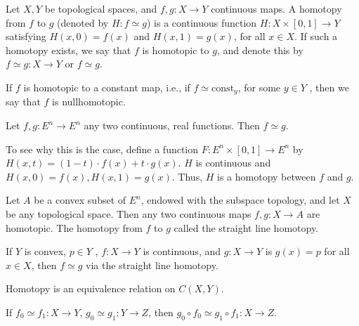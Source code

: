 \begin{definition}{}{}
    Let $X, Y$ be topological spaces, and $f, g : X \rightarrow Y$ continuous maps.
A homotopy from $f$ to $g$ (denoted by $H: f\simeq g$) is a continuous function $H : X \times [0, 1] \rightarrow Y$ satisfying
$H(x, 0) = f(x)$ and $H(x, 1) = g(x)$, for all $x \in X$.
If such a homotopy exists, we say that $f$ is homotopic to $g$, 
and denote this by $f\simeq g:X\rightarrow Y$ or $f\simeq g$. 
\end{definition}

\begin{definition}{}{}
    If $f$ is homotopic to a constant map, i.e., if $f \simeq \text{const}_y$, 
for some $y \in Y$ , then we say that $f$ is nullhomotopic.
\end{definition}

\begin{proposition}{}{}
    Let $f, g : E^n \rightarrow E^n$ any two continuous, real functions. 
    Then $f \simeq g$. 
\end{proposition}
To see why this is the case, 
define a function $F : E^n \times [0, 1] \rightarrow E^n$ by
$H(x,t)=(1-t)\cdot f(x)+t\cdot g(x)$.
$H$ is continuous and $H(x,0)=f(x),H(x,1)=g(x)$. 
Thus, $H$ is a homotopy between $f$ and $g$.

\begin{proposition}{}{}
    Let $A$ be a convex subset of $E^n$, endowed with the subspace topology,
and let $X$ be any topological space. Then any two continuous maps $f, g : X \rightarrow A$ are
homotopic. The homotopy from $f$ to $g$ called the straight line homotopy.
\end{proposition}

\begin{proposition}{}{}
    If $Y$ is convex, $p \in Y$ , $f : X \rightarrow Y$ 
    is continuous, and $g : X \rightarrow Y$ is $g(x) = p$
    for all $x \in X$, then $f \simeq g$ via the straight line homotopy.
\end{proposition}



\begin{proposition}{}{}
    Homotopy is an equivalence relation on $C(X, Y)$.
\end{proposition}

\begin{proposition}{}{}
    If $f_0\simeq f_1: X\rightarrow Y$,
    $g_0\simeq g_1:Y\rightarrow Z$, then
    $g_0\circ f_0\simeq g_1\circ f_1:X\rightarrow Z$.
\end{proposition}

